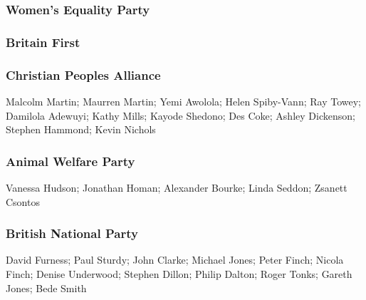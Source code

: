 \begin{resultsiii}
\subsubsection*{Women's Equality Party}

\subsubsection*{Britain First}

\subsubsection*{Christian Peoples Alliance}
Malcolm Martin; Maurren Martin; Yemi Awolola; Helen Spiby-Vann; Ray Towey; Damilola Adewuyi; Kathy Mills; Kayode Shedono; Des Coke; Ashley Dickenson; Stephen Hammond; Kevin Nichols

\subsubsection*{Animal Welfare Party}
Vanessa Hudson; Jonathan Homan; Alexander Bourke; Linda Seddon; Zsanett Csontos

\subsubsection*{British National Party}
David Furness; Paul Sturdy; John Clarke; Michael Jones; Peter Finch; Nicola Finch; Denise Underwood; Stephen Dillon; Philip Dalton; Roger Tonks; Gareth Jones; Bede Smith

\end{resultsiii}
